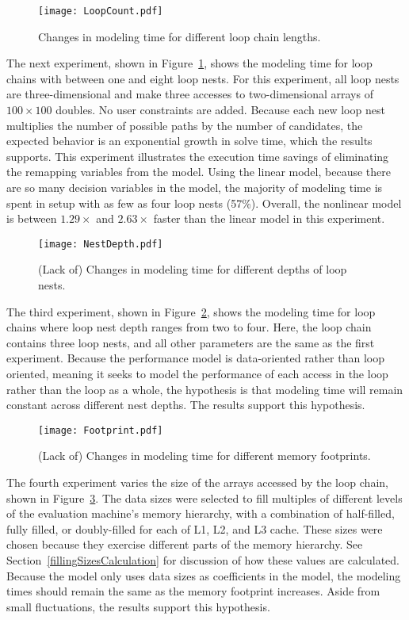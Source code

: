 \begin{figure}
\texttt{[image: LoopCount.pdf]}
\caption{Changes in modeling time for different loop chain lengths.}\label{LoopCount}
\end{figure}
The next experiment, shown in Figure~\ref{LoopCount}, shows the modeling time for loop chains with between one and eight loop nests.
For this experiment, all loop nests are three-dimensional and make three accesses to two-dimensional arrays of $100\times100$ doubles. 
No user constraints are added.
Because each new loop nest multiplies the number of possible paths by the number of candidates, the expected behavior is an exponential growth in solve time, which the results supports.
This experiment illustrates the execution time savings of eliminating the remapping variables from the model.
Using the linear model, because there are so many decision variables in the model, the majority of modeling time is spent in setup with as few as four loop nests (57\%).
Overall, the nonlinear model is between $1.29\times$ and $2.63\times$ faster than the linear model in this experiment.

\begin{figure}
	\texttt{[image: NestDepth.pdf]}
	\caption{(Lack of) Changes in modeling time for different depths of loop nests.}\label{NestDepth}
\end{figure}
The third experiment, shown in Figure~\ref{NestDepth}, shows the modeling time for loop chains where loop nest depth ranges from two to four.
Here, the loop chain contains three loop nests, and all other parameters are the same as the first experiment.
Because the performance model is data-oriented rather than loop oriented, meaning it seeks to model the performance of each access in the loop rather than the loop as a whole, the hypothesis is that modeling time will remain constant across different nest depths.
The results support this hypothesis.

\begin{figure}
\texttt{[image: Footprint.pdf]}
\caption{(Lack of) Changes in modeling time for different memory footprints.}\label{Footprint}
\end{figure}
The fourth experiment varies the size of the arrays accessed by the loop chain, shown in Figure~\ref{Footprint}.
The data sizes were selected to fill multiples of different levels of the evaluation machine's memory hierarchy, with a combination of half-filled, fully filled, or doubly-filled for each of L1, L2, and L3 cache.
These sizes were chosen because they exercise different parts of the memory hierarchy.
See Section~\ref{fillingSizesCalculation} for discussion of how these values are calculated.
Because the model only uses data sizes as coefficients in the model, the modeling times should remain the same as the memory footprint increases.
Aside from small fluctuations, the results support this hypothesis.


